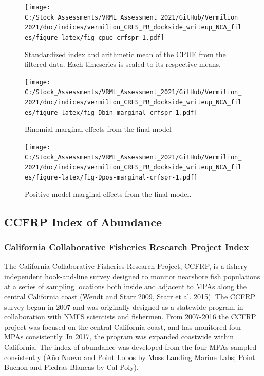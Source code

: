 \documentclass[
  english,
  a4paper,
]{article}
\begin{document}
\begin{figure}
\centering
\texttt{[image: C:/Stock\_Assessments/VRML\_Assessment\_2021/GitHub/Vermilion\_2021/doc/indices/vermilion\_CRFS\_PR\_dockside\_writeup\_NCA\_files/figure-latex/fig-cpue-crfspr-1.pdf]}
\caption{\label{fig:fig-cpue-crfspr}Standardized index and arithmetic mean of the CPUE from the filtered data. Each timeseries is scaled to its respective means.}
\end{figure}

\begin{figure}
\centering
\texttt{[image: C:/Stock\_Assessments/VRML\_Assessment\_2021/GitHub/Vermilion\_2021/doc/indices/vermilion\_CRFS\_PR\_dockside\_writeup\_NCA\_files/figure-latex/fig-Dbin-marginal-crfspr-1.pdf]}
\caption{\label{fig:fig-Dbin-marginal-crfspr}Binomial marginal effects from the final model}
\end{figure}

\begin{figure}
\centering
\texttt{[image: C:/Stock\_Assessments/VRML\_Assessment\_2021/GitHub/Vermilion\_2021/doc/indices/vermilion\_CRFS\_PR\_dockside\_writeup\_NCA\_files/figure-latex/fig-Dpos-marginal-crfspr-1.pdf]}
\caption{\label{fig:fig-Dpos-marginal-crfspr}Positive model marginal effects from the final model.}
\end{figure}

\clearpage

\hypertarget{ccfrp-index}{%
\subsection{CCFRP Index of Abundance}\label{ccfrp-index}}

\hypertarget{california-collaborative-fisheries-research-project-index}{%
\subsubsection{California Collaborative Fisheries Research Project Index}\label{california-collaborative-fisheries-research-project-index}}

The California Collaborative Fisheries Research Project, \href{https://www.mlml.calstate.edu/ccfrp/}{CCFRP},
is a fishery-independent
hook-and-line survey designed to monitor nearshore fish populations at a series of sampling
locations both inside and adjacent to MPAs along the central California coast
(Wendt and Starr 2009, Starr et al. 2015). The CCFRP survey began in 2007 and was originally
designed as a statewide program in collaboration with NMFS scientists and fishermen.
From 2007-2016 the CCFRP project was focused on the central California coast, and has monitored
four MPAs consistently. In 2017,
the program was expanded coastwide within California. The index of abundance was
developed from the four MPAs sampled consistently (Año Nuevo and Point Lobos
by Moss Landing Marine Labs; Point Buchon and Piedras Blancas by Cal Poly).
\end{document}

